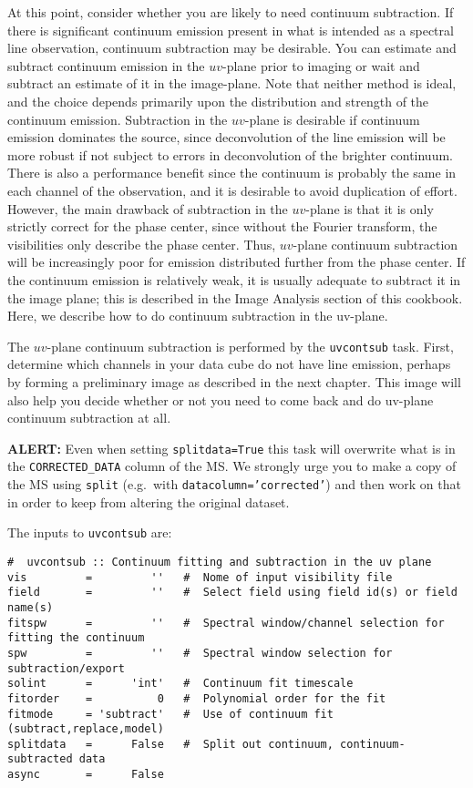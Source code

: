 At this point, consider whether you are likely to need continuum
subtraction.  If there is significant continuum emission present in
what is intended as a spectral line observation, continuum subtraction
may be desirable.  You can estimate and subtract continuum emission in
the $uv$-plane prior to imaging or wait and subtract an estimate of it
in the image-plane.  Note that neither method is ideal, and the choice
depends primarily upon the distribution and strength of the continuum
emission.  Subtraction in the $uv$-plane is desirable if continuum
emission dominates the source, since deconvolution of the line
emission will be more robust if not subject to errors in deconvolution
of the brighter continuum.  There is also a performance benefit since
the continuum is probably the same in each channel of the observation,
and it is desirable to avoid duplication of effort.  However, the main
drawback of subtraction in the $uv$-plane is that it is only strictly
correct for the phase center, since without the Fourier transform, the
visibilities only describe the phase center.  Thus, $uv$-plane continuum
subtraction will be increasingly poor for emission distributed further
from the phase center.  If the continuum emission is relatively weak,
it is usually adequate to subtract it in the image plane; this is
described in the Image Analysis section of this cookbook.  Here, we
describe how to do continuum subtraction in the uv-plane.

The $uv$-plane continuum subtraction is performed by the {\tt uvcontsub} task.
First, determine which channels in your data cube do not have line
emission, perhaps by forming a preliminary image as described in the
next chapter.  This image will also help you decide whether or not you
need to come back and do uv-plane continuum subtraction at all.

{\bf ALERT:} Even when setting {\tt splitdata=True} this task will
overwrite what is in the {\tt CORRECTED\_DATA} column of the MS.  We
strongly urge you to make a copy of the MS using {\tt split} (e.g.\ 
with {\tt datacolumn='corrected'}) and then work on that in order to
keep from altering the original dataset.

The inputs to {\tt uvcontsub} are:
\small
\begin{verbatim}
#  uvcontsub :: Continuum fitting and subtraction in the uv plane
vis         =         ''   #  Nome of input visibility file
field       =         ''   #  Select field using field id(s) or field name(s)
fitspw      =         ''   #  Spectral window/channel selection for fitting the continuum
spw         =         ''   #  Spectral window selection for subtraction/export
solint      =      'int'   #  Continuum fit timescale
fitorder    =          0   #  Polynomial order for the fit
fitmode     = 'subtract'   #  Use of continuum fit (subtract,replace,model)
splitdata   =      False   #  Split out continuum, continuum-subtracted data
async       =      False   
\end{verbatim}
\normalsize

